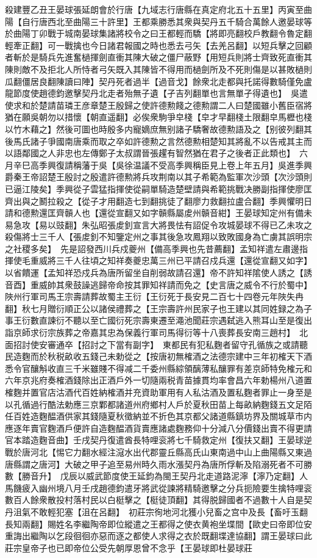 殺建豐乙丑王晏球張延朗會於行唐【九域志行唐縣在真定府北五十五里】丙寅至曲陽【自行唐西北至曲陽三十許里】王都乘勝悉其衆與契丹五千騎合萬餘人邀晏球等於曲陽丁卯戰于城南晏球集諸將校令之曰王都輕而驕【將即亮翻校戶教翻令魯定翻輕牽正翻】可一戰擒也今日諸君報國之時也悉去弓矢【去羌呂翻】以短兵擊之回顧者斬於是騎兵先進奮檛揮劍直衝其陳大破之僵尸蔽野【用短兵則將士齊致死直衝其陳則敵不及拒北人所恃者弓矢既入其陳皆不得用而檛劍所及不死則傷是以甚敗檛則瓜翻僵居良翻陳讀曰陣】契丹死者過半【過音戈】餘衆北走都與托諾得數騎僅免盧龍節度使趙德鈞邀擊契丹北走者殆無子遺【孑吉列翻單也言無單孑得遺也】　吳遣使求和於楚請苗璘王彦章楚王殷歸之使許德勲餞之德勲謂二人曰楚國雖小舊臣宿將猶在願吳朝勿以措懷【朝直遥翻】必俟衆駒爭皁棧【皁才早翻棧土限翻皁馬櫪也棧以竹木藉之】然後可圖也時殷多内寵嫡庶無别諸子驕奢故德勲語及之【别彼列翻其後馬氏諸子爭國南唐乘而取之卒如許德勲之言然德勲相楚知其將亂不以告戒其主而以語鄰國之人非忠也左傳鄭子太叔謂晉張趯有智然猶在君子之後者正此類也】　六月辛巳高季興復請稱藩于吳【吳徐温議不受高季興稱臣見上卷上年五月】吳進季興爵秦王帝詔楚王殷討之殷遣許德勲將兵攻荆南以其子希範為監軍次沙頭【次沙頭則已逼江陵矣】季興從子雲猛指揮使從嗣單騎造楚壁請與希範挑戰决勝副指揮使廖匡齊出與之鬭拉殺之【從子才用翻造七到翻挑徒了翻廖力救翻拉盧合翻】季興懼明日請和德勲還匡齊贑人也【還從宣翻又如字贑縣屬䖍州贑音紺】王晏球知定州有備未易急攻【易以豉翻】朱弘昭張䖍釗宣言大將畏怯有詔促令攻城晏球不得已乙未攻之殺傷將士三千人【張䖍釗不知鑒定州之事其後急攻鳳翔以致敗國身為亡虜其誤明宗之社稷多矣】　先是詔發西川兵戍夔州【備高季興也先昔薦翻】孟知祥遣左肅邊指揮使毛重威將三千人往頃之知祥奏夔忠萬三州已平請召戍兵還【還從宣翻又如字】以省饋運【孟知祥恐戍兵為唐所留坐自削弱故請召還】帝不許知祥隂使人誘之【誘音酉】重威帥其衆鼓譟逃歸帝命按其罪知祥請而免之【史言唐之威令不行於蜀中】　陜州行軍司馬王宗壽請葬故蜀主王衍【王衍死于長安見二百七十四卷元年陜失冉翻】秋七月贈衍順正公以諸侯禮葬之【王宗壽許州民家子也王建以其同姓録之為子事王衍數直諫衍不聽以至亡國衍死宗壽東遷至澠池聞莊宗遇弑逃入熊耳山至是復出詣京師求衍宗族葬之帝嘉其忠為保義行軍司馬得衍等十八喪葬長安南三趙村】　北面招討使安審通卒【招討之下當有副字】　東都民有犯私麴者留守孔循族之或請聽民造麴而於秋税畝收五錢己未勅從之【按唐初無榷酒之法德宗建中三年初榷天下酒悉令官釀斛收直三千米雖賤不得减二千委州縣綜領醨薄私釀罪有差京師特免榷元和六年京兆府奏榷酒錢除出正酒戶外一切隨兩税青苗據貫均率會昌六年勅楊州八道置榷麴并置官店沽酒代百姓納榷酒并充資助軍用有人私沽酒及置私麴者罪止一身至是以孔循過行酷法勅應三京鄴都諸道州府鄉村人戶於夏秋田苗上每畝納麴錢五文足陌任百姓造麴醖酒供家其錢隨夏秋徵納並不折色其京都父諸道縣鎮坊界及關城草市内應逐年賣官麴酒戶便許自造麴醖酒貨賣應諸處麴務仰十分減八分價錢出賣不得更請官本踏造麴音曲】壬戌契丹復遣酋長特哩衮將七千騎救定州【復扶又翻】王晏球逆戰於唐河北【惕它力翻水經注滱水出代郡靈丘縣高氏山東南過中山上曲陽縣又東過唐縣謂之唐河】大破之甲子追至易州時久雨水漲契丹為唐所俘斬及陷溺死者不可勝數【勝音升】　戊辰以威武節度使王延鈞為閩王契丹北走道路泥濘【濘乃定翻】人馬饑疲入幽州境八月壬戌趙德鈞遣牙將武從諫將精騎邀擊之分兵扼險要生擒特哩衮數百人餘衆散投村落村民以白梃擊之【梃徒頂翻】其得脱歸國者不過數十人自是契丹沮氣不敢輕犯塞【沮在呂翻】　初莊宗徇地河北獲小兒畜之宫中及長【畜吁玉翻長知兩翻】賜姓名李繼陶帝即位縱遣之王都得之使衣黄袍坐堞間【歐史曰帝即位安重誨出繼陶以乞段徊徊亦惡而逐之都使人求得之衣於既翻堞達協翻】謂王晏球曰此莊宗皇帝子也已即帝位公受先朝厚恩曾不念乎【王晏球即杜晏球莊